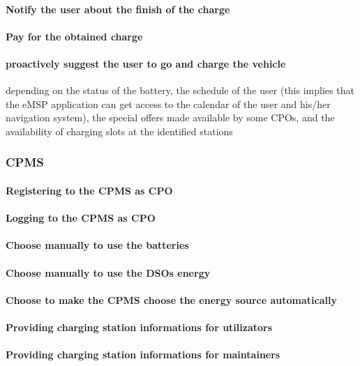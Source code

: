 \paragraph{Notify the user about the finish of the charge}

\paragraph{Pay for the obtained charge}

\paragraph{proactively suggest the user to go and charge the vehicle}
depending on the status of the 
battery, the schedule of the user (this implies that the eMSP application can get access to the 
calendar of the user and his/her navigation system), the special offers made available by some 
CPOs, and the availability of charging slots at the identified stations

\subsubsection{\ac{CPMS}}
\paragraph{Registering to the \ac{CPMS} as \ac{CPO}}
\paragraph{Logging to the \ac{CPMS} as \ac{CPO}}
\paragraph{Choose manually to use the batteries}
\paragraph{Choose manually to use the \acp{DSO} energy}
\paragraph{Choose to make the \ac{CPMS} choose the energy source automatically}
\paragraph{Providing charging station informations for utilizators}
\paragraph{Providing charging station informations for maintainers}
